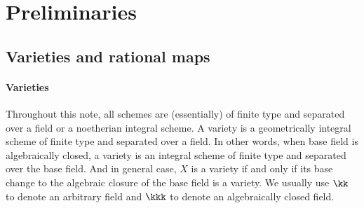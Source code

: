 \section{Preliminaries}


\subsection{Varieties and rational maps}

\paragraph{Varieties}
Throughout this note, all schemes are (essentially) of finite type and separated over a field or a noetherian integral scheme.
A variety is a geometrically integral scheme of finite type and separated over a field.
In other words, when base field is algebraically closed, a variety is an integral scheme of finite type and separated over the base field.
And in general case, $X$ is a variety if and only if its base change to the algebraic closure of the base field is a variety.
We usually use $\kk$ to denote an arbitrary field and $\kkk$ to denote an algebraically closed field.

